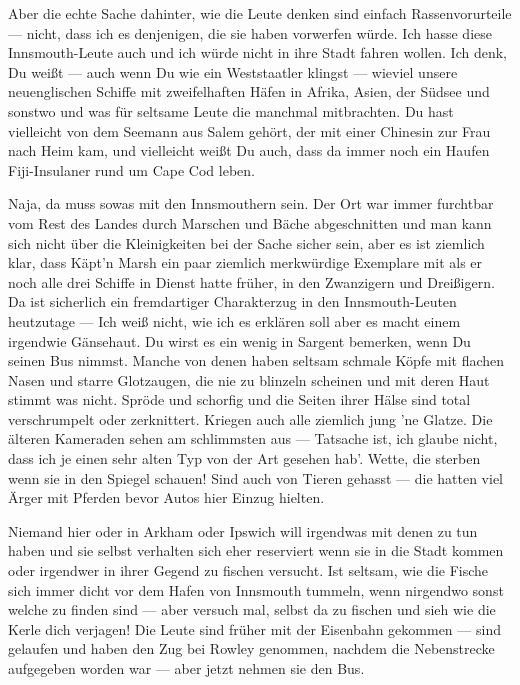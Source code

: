 Aber die echte Sache dahinter, wie die Leute denken sind einfach Rassenvorurteile --- nicht, dass ich es denjenigen, die sie haben vorwerfen würde. Ich hasse diese Innsmouth-Leute auch und ich würde nicht in ihre Stadt fahren wollen. Ich denk, Du weißt --- auch wenn Du wie ein Weststaatler klingst --- wieviel unsere neuenglischen Schiffe mit zweifelhaften Häfen in Afrika, Asien, der Südsee und sonstwo und was für seltsame Leute die manchmal mitbrachten. Du hast vielleicht von dem Seemann aus Salem gehört, der mit einer Chinesin zur Frau nach Heim kam, und vielleicht weißt Du auch, dass da immer noch ein Haufen Fiji-Insulaner rund um Cape Cod leben.

Naja, da muss sowas mit den Innsmouthern sein. Der Ort war immer furchtbar vom Rest des Landes durch Marschen und Bäche abgeschnitten und man kann sich nicht über die Kleinigkeiten bei der Sache sicher sein, aber es ist ziemlich klar, dass Käpt'n Marsh ein paar ziemlich merkwürdige Exemplare mit als er noch alle drei Schiffe in Dienst hatte früher, in den Zwanzigern und Dreißigern. Da ist sicherlich ein fremdartiger Charakterzug in den Innsmouth-Leuten heutzutage --- Ich weiß nicht, wie ich es erklären soll aber es macht einem irgendwie Gänsehaut. Du wirst es ein wenig in Sargent bemerken, wenn Du seinen Bus nimmst. Manche von denen haben seltsam schmale Köpfe mit flachen Nasen und starre Glotzaugen, die nie zu blinzeln scheinen und mit deren Haut stimmt was nicht. Spröde und schorfig und die Seiten ihrer Hälse sind total verschrumpelt oder zerknittert. Kriegen auch alle ziemlich jung 'ne Glatze. Die älteren Kameraden sehen am schlimmsten aus --- Tatsache ist, ich glaube nicht, dass ich je einen sehr alten Typ von der Art gesehen hab'. Wette, die sterben wenn sie in den Spiegel schauen! Sind auch von Tieren gehasst --- die hatten viel Ärger mit Pferden bevor Autos hier Einzug hielten.

Niemand hier oder in Arkham oder Ipswich will irgendwas mit denen zu tun haben und sie selbst verhalten sich eher reserviert wenn sie in die Stadt kommen oder irgendwer in ihrer Gegend zu fischen versucht. Ist seltsam, wie die Fische sich immer dicht vor dem Hafen von Innsmouth tummeln, wenn nirgendwo sonst welche zu finden sind --- aber versuch mal, selbst da zu fischen und sieh wie die Kerle dich verjagen! Die Leute sind früher mit der Eisenbahn gekommen --- sind gelaufen und haben den Zug bei Rowley genommen, nachdem die Nebenstrecke aufgegeben worden war --- aber jetzt nehmen sie den Bus.


